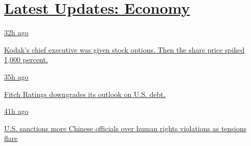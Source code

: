 \hypertarget{latest-updates-economy}{%
\section{\texorpdfstring{\href{https://www.nytimes3xbfgragh.onion/live/2020/07/31/business/stock-market-today-coronavirus?action=click\&pgtype=Article\&state=default\&region=MAIN_CONTENT_1\&context=storylines_live_updates}{Latest
Updates:
Economy}}{Latest Updates: Economy}}\label{latest-updates-economy}}

\href{https://www.nytimes3xbfgragh.onion/live/2020/07/31/business/stock-market-today-coronavirus?action=click\&pgtype=Article\&state=default\&region=MAIN_CONTENT_1\&context=storylines_live_updates\#kodaks-chief-executive-was-given-stock-options-then-the-share-price-spiked-1000-percent}{32h
ago}

\href{https://www.nytimes3xbfgragh.onion/live/2020/07/31/business/stock-market-today-coronavirus?action=click\&pgtype=Article\&state=default\&region=MAIN_CONTENT_1\&context=storylines_live_updates\#kodaks-chief-executive-was-given-stock-options-then-the-share-price-spiked-1000-percent}{Kodak's
chief executive was given stock options. Then the share price spiked
1,000 percent.}

\href{https://www.nytimes3xbfgragh.onion/live/2020/07/31/business/stock-market-today-coronavirus?action=click\&pgtype=Article\&state=default\&region=MAIN_CONTENT_1\&context=storylines_live_updates\#fitch-ratings-downgrades-its-outlook-on-us-debt}{35h
ago}

\href{https://www.nytimes3xbfgragh.onion/live/2020/07/31/business/stock-market-today-coronavirus?action=click\&pgtype=Article\&state=default\&region=MAIN_CONTENT_1\&context=storylines_live_updates\#fitch-ratings-downgrades-its-outlook-on-us-debt}{Fitch
Ratings downgrades its outlook on U.S. debt.}

\href{https://www.nytimes3xbfgragh.onion/live/2020/07/31/business/stock-market-today-coronavirus?action=click\&pgtype=Article\&state=default\&region=MAIN_CONTENT_1\&context=storylines_live_updates\#us-sanctions-more-chinese-officials-over-human-rights-violations-as-tensions-flare}{41h
ago}

\href{https://www.nytimes3xbfgragh.onion/live/2020/07/31/business/stock-market-today-coronavirus?action=click\&pgtype=Article\&state=default\&region=MAIN_CONTENT_1\&context=storylines_live_updates\#us-sanctions-more-chinese-officials-over-human-rights-violations-as-tensions-flare}{U.S.
sanctions more Chinese officials over human rights violations as
tensions flare}

